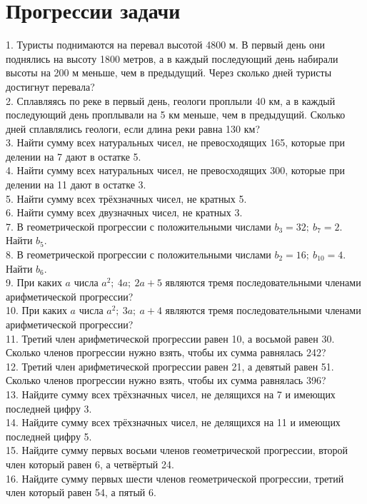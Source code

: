 \section{Прогрессии задачи}
1. Туристы поднимаются на перевал высотой 4800 м. В первый день они поднялись на высоту 1800 метров, а в каждый последующий день набирали высоты на 200 м меньше, чем в предыдущий. Через сколько дней туристы достигнут перевала?\\
2. Сплавляясь по реке в первый день, геологи проплыли 40 км, а в каждый последующий день проплывали на 5 км меньше, чем в предыдущий. Сколько дней сплавлялись геологи, если длина реки равна 130 км?\\
3. Найти сумму всех натуральных чисел, не превосходящих 165, которые при делении на 7 дают в остатке 5.\\
4. Найти сумму всех натуральных чисел, не превосходящих 300, которые при делении на 11 дают в остатке 3.\\
5. Найти сумму всех трёхзначных чисел, не кратных 5.\\
6. Найти сумму всех двузначных чисел, не кратных 3.\\
7. В геометрической прогрессии с положительными числами $b_3=32;\ b_7=2.$ Найти $b_5.$\\
8. В геометрической прогрессии с положительными числами $b_2=16;\ b_{10}=4.$ Найти $b_6.$\\
9. При каких $a$ числа $a^2;\ 4a;\ 2a+5$ являются тремя последовательными членами арифметической прогрессии?\\
10. При каких $a$ числа $a^2;\ 3a;\ a+4$ являются тремя последовательными членами арифметической прогрессии?\\
11. Третий член арифметической прогрессии равен 10, а восьмой равен 30. Сколько членов прогрессии нужно взять, чтобы их сумма равнялась 242?\\
12. Третий член арифметической прогрессии равен 21, а девятый равен 51. Сколько членов прогрессии нужно взять, чтобы их сумма равнялась 396?\\
13. Найдите сумму всех трёхзначных чисел, не делящихся на 7 и имеющих последней цифру 3.\\
14. Найдите сумму всех трёхзначных чисел, не делящихся на 11 и имеющих последней цифру 5.\\
15. Найдите сумму первых восьми членов геометрической прогрессии, второй член который равен 6, а четвёртый 24.\\
16. Найдите сумму первых шести членов геометрической прогрессии, третий член который равен 54, а пятый 6.\\
